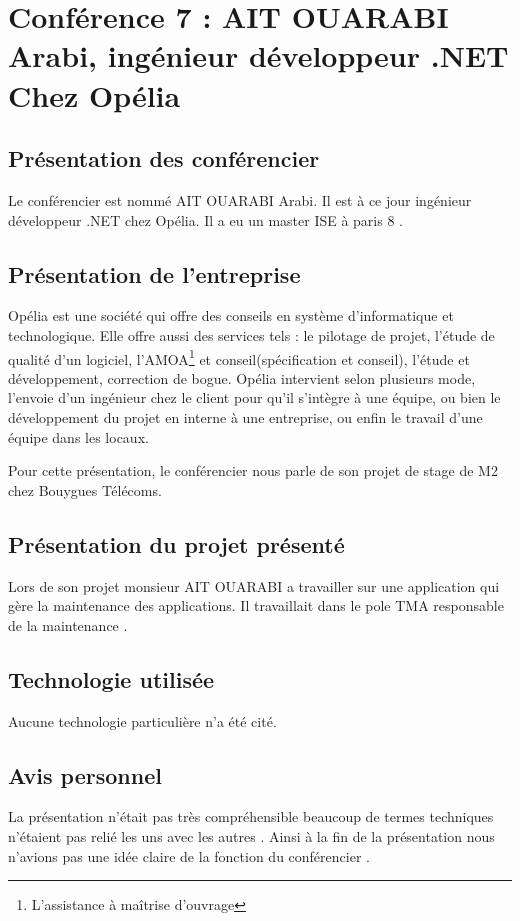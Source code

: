 \section{Conférence 7 : AIT OUARABI Arabi, ingénieur développeur .NET Chez Opélia}
 	\subsection{Présentation des conférencier}
 	Le conférencier est  nommé AIT OUARABI Arabi. Il est à ce jour ingénieur développeur .NET chez Opélia. Il a eu un master ISE à paris 8 . 
	\subsection{Présentation de l'entreprise}
	Opélia est une société qui offre des conseils en système d'informatique et technologique. Elle offre aussi des services tels : le pilotage de projet, l’étude de qualité d'un logiciel, 
	l'AMOA\footnote{L'assistance à maîtrise d'ouvrage} et conseil(spécification et conseil), l'étude et développement, correction de bogue. Opélia intervient selon plusieurs mode, l'envoie d'un ingénieur chez le client pour qu'il s'intègre à une équipe, ou bien le développement du projet en interne à une entreprise, ou enfin le travail d'une équipe dans les locaux.

	Pour cette présentation, le conférencier nous parle de son projet de stage de M2 chez Bouygues Télécoms.

	\subsection{Présentation du projet présenté}
	Lors de son projet monsieur AIT OUARABI a travailler sur une application qui gère la maintenance des applications. Il travaillait dans le pole TMA responsable de la maintenance .
	\subsection{Technologie utilisée}
	Aucune technologie particulière n'a été cité. 
	\subsection{Avis personnel} 
	La présentation n’était pas très compréhensible beaucoup de termes techniques n’étaient pas relié les uns avec les autres . Ainsi à la fin de la présentation nous n'avions pas une idée claire de la fonction du conférencier .
